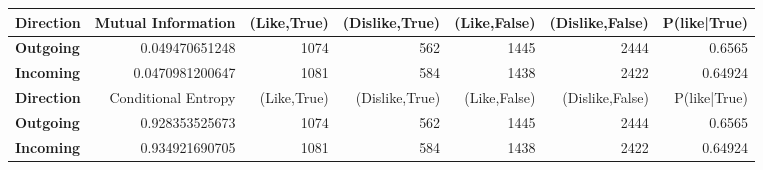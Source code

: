 \begin{table}
\begin{tabular}{| >{\small}l | >{\small}r | >{\small}r | >{\small}r | >{\small}r | >{\small}r | >{\small}r |}
		\hline
		\hline
		\textbf{Direction} & Mutual Information & (Like,True) & (Dislike,True) & (Like,False) & (Dislike,False)  & P(like|True)\\
		\hline
		\textbf{Outgoing}  &  0.049470651248 & 1074 & 562 & 1445 & 2444 &  0.6565\\
		\hline
		\textbf{Incoming}  &  0.0470981200647 & 1081 & 584 & 1438 & 2422 & 0.64924\\
		\hline
		\hline
		\textbf{Direction} & Conditional Entropy &  (Like,True) & (Dislike,True) & (Like,False) & (Dislike,False)  & P(like|True)\\
		\hline
		\textbf{Outgoing}  &  0.928353525673 & 1074 & 562 & 1445 & 2444 & 0.6565\\
		\hline
		\textbf{Incoming}  &  0.934921690705 & 1081 & 584 & 1438 & 2422 & 0.64924\\
		\hline
	\end{tabular}
\end{table}
		

